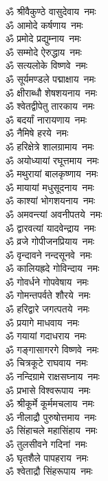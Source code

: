 \begin{multicols}{2}
\begin{flushleft}
ॐ श्रीवैकुण्ठे वासुदेवाय~नमः\\
ॐ आमोदे कर्षणाय~नमः\\
ॐ प्रमोदे प्रद्युम्नाय~नमः\\
ॐ सम्मोदे ऐरुद्धाय~नमः\\
ॐ सत्यलोके विष्णवे~नमः\\
ॐ सूर्यमण्डले पद्माक्षाय~नमः\\
ॐ क्षीराब्धौ शेषशयनाय~नमः\\
ॐ श्वेतद्वीपेतु तारकाय~नमः\\
ॐ बदर्यां नारायणाय~नमः\\
ॐ नैमिषे हरये~नमः\hfill{}\\
ॐ हरिक्षेत्रे शालग्रामाय~नमः\\
ॐ अयोध्यायां रघूत्तमाय~नमः\\
ॐ मथुरायां बालकृष्णाय~नमः\\
ॐ मायायां मधुसूदनाय~नमः\\
ॐ काश्यां भोगशयनाय~नमः\\
ॐ अमवन्त्यां अवनीपतये~नमः\\
ॐ द्वारवत्यां यादवेन्द्राय~नमः\\
ॐ व्रजे गोपीजनप्रियाय~नमः\\
ॐ वृन्दावने नन्दसूनवे~नमः\\
ॐ कालियह्रदे गोविन्दाय~नमः\hfill{}\\
ॐ गोवर्धने गोपवेषाय~नमः\\
ॐ गोमन्तपर्वते शौरये~नमः\\
ॐ हरिद्वारे जगत्पतये~नमः\\
ॐ प्रयागे माधवाय~नमः\\
ॐ गयायां गदाधराय~नमः\\
ॐ गङ्गासागरगे विष्णवे~नमः\\
ॐ चित्रकूटे राघवाय~नमः\\
ॐ नन्दिग्रामे राक्षसघ्नाय~नमः\\
ॐ प्रभासे विश्वरूपाय~नमः\\
ॐ श्रीकूर्मे कूर्ममचलाय~नमः\hfill{}\\
ॐ नीलाद्रौ पुरुषोत्तमाय~नमः\\
ॐ सिंहाचले महासिंहाय~नमः\\
ॐ तुलसीवने गदिनां~नमः\\
ॐ घृतशैले पापहराय~नमः\\
ॐ श्वेताद्रौ सिंहरूपाय~नमः\\

\end{flushleft}
\end{multicols}
